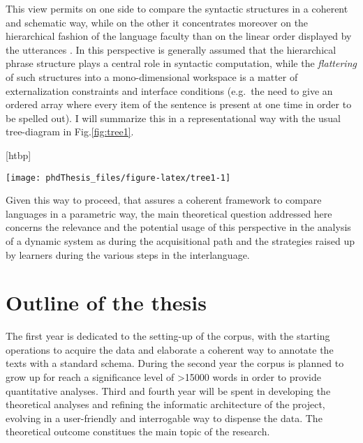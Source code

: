 \documentclass[
  a4paper,
  twoside,
  12pt,
  chapterprefix=false,
  bibliography=totocnumbered,
  listof=flat]{scrbook}
\makeatletter
\def\fps@figure{htbp}
\renewenvironment{figure}[1][\fps@figure]{
  \edef\@tempa{\noexpand\@float{figure}[#1]} 
  \@tempa
  \sffamily
}{
  \end@float
}
\makeatother
\begin{document}
This view permits on one side to compare the syntactic structures in a coherent and schematic way, while on the other it concentrates moreover on the hierarchical fashion of the language faculty than on the linear order displayed by the utterances \citep{kayne1994, moro2000}. In this perspective is generally assumed that the hierarchical phrase structure plays a central role in syntactic computation, while the \emph{flattering} of such structures into a mono-dimensional workspace is a matter of externalization constraints and interface conditions (e.g.~the need to give an ordered array where every item of the sentence is present at one time in order to be spelled out).
I will summarize this in a representational way with the usual tree-diagram in Fig.\ref{fig:tree1}.

\begin{figure}

{\centering \texttt{[image: phdThesis\_files/figure-latex/tree1-1]} 

}

\caption{Structural representation of a simple sentence}\label{fig:tree1}
\end{figure}

Given this way to proceed, that assures a coherent framework to compare languages in a parametric way, the main theoretical question addressed here concerns the relevance and the potential usage of this perspective in the analysis of a dynamic system as during the acquisitional path and the strategies raised up by learners during the various steps in the interlanguage.

\hypertarget{outline-of-the-thesis}{%
\section{Outline of the thesis}\label{outline-of-the-thesis}}

The first year is dedicated to the setting-up of the corpus, with the starting operations to acquire the data and elaborate a coherent way to annotate the texts with a standard schema. During the second year the corpus is planned to grow up for reach a significance level of \textgreater15000 words in order to provide quantitative analyses.
Third and fourth year will be spent in developing the theoretical analyses and refining the informatic architecture of the project, evolving in a user-friendly and interrogable way to dispense the data. The theoretical outcome constitues the main topic of the research.
\end{document}
